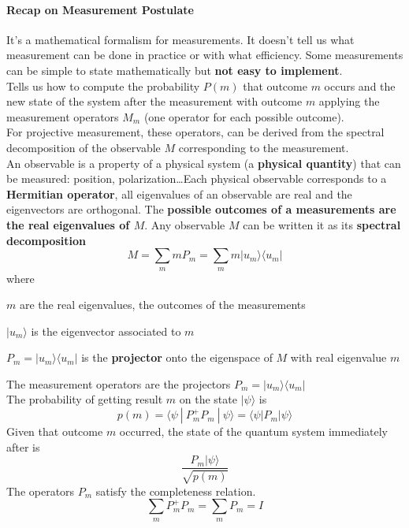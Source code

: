 \documentclass[10pt]{report}
\begin{document}
\paragraph{Recap on Measurement Postulate} It's a mathematical formalism for measurements. It doesn't tell us what measurement can be done in practice or with what efficiency. Some measurements can be simple to state mathematically but \textbf{not easy to implement}.\\
Tells us how to compute the probability $P(m)$ that outcome $m$ occurs and the new state of the system after the measurement with outcome $m$ applying the measurement operators $M_m$ (one operator for each possible outcome).\\
For projective measurement, these operators, can be derived from the spectral decomposition of the observable $M$ corresponding to the measurement.\\
An observable is a property of a physical system (a \textbf{physical quantity}) that can be measured: position, polarization\ldots Each physical observable corresponds to a \textbf{Hermitian operator}, all eigenvalues of an observable are real and the eigenvectors are orthogonal. The \textbf{possible outcomes of a measurements are the real eigenvalues of $M$}.
Any observable $M$ can be written it as its \textbf{spectral decomposition} $$M = \sum_m mP_m = \sum_m m|u_m\rangle\langle u_m|$$
where \begin{list}{}{}
	\item $m$ are the real eigenvalues, the outcomes of the measurements
	\item $|u_m\rangle$ is the eigenvector associated to $m$
	\item $P_m = |u_m\rangle\langle u_m|$ is the \textbf{projector} onto the eigenspace of $M$ with real eigenvalue $m$
\end{list}
The measurement operators are the projectors $P_m = |u_m\rangle\langle u_m|$\\
The probability of getting result $m$ on the state $|\psi\rangle$ is $$p(m) = \langle\psi\:|\:P_m^+ P_m\:|\:\psi\rangle = \langle\psi|P_m|\psi\rangle $$
Given that outcome $m$ occurred, the state of the quantum system immediately after is $$\frac{P_m|\psi\rangle}{\sqrt{p(m)}}$$
The operators $P_m$ satisfy the completeness relation.
$$\sum_m P_m^+P_m = \sum_m P_m = I$$
\end{document}
